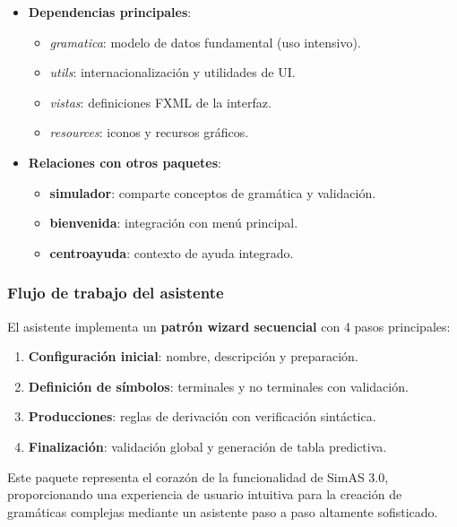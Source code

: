 \begin{itemize}
    \item \textbf{Dependencias principales}:
    \begin{itemize}
        \item \textit{gramatica}: modelo de datos fundamental (uso intensivo).
        \item \textit{utils}: internacionalización y utilidades de UI.
        \item \textit{vistas}: definiciones FXML de la interfaz.
        \item \textit{resources}: iconos y recursos gráficos.
    \end{itemize}

    \item \textbf{Relaciones con otros paquetes}:
    \begin{itemize}
        \item \textbf{simulador}: comparte conceptos de gramática y validación.
        \item \textbf{bienvenida}: integración con menú principal.
        \item \textbf{centroayuda}: contexto de ayuda integrado.
    \end{itemize}
\end{itemize}

\subsubsection{Flujo de trabajo del asistente}

El asistente implementa un \textbf{patrón wizard secuencial} con 4 pasos principales:

\begin{enumerate}
    \item \textbf{Configuración inicial}: nombre, descripción y preparación.
    \item \textbf{Definición de símbolos}: terminales y no terminales con validación.
    \item \textbf{Producciones}: reglas de derivación con verificación sintáctica.
    \item \textbf{Finalización}: validación global y generación de tabla predictiva.
\end{enumerate}

Este paquete representa el corazón de la funcionalidad de SimAS 3.0, proporcionando una experiencia de usuario intuitiva para la creación de gramáticas complejas mediante un asistente paso a paso altamente sofisticado.


